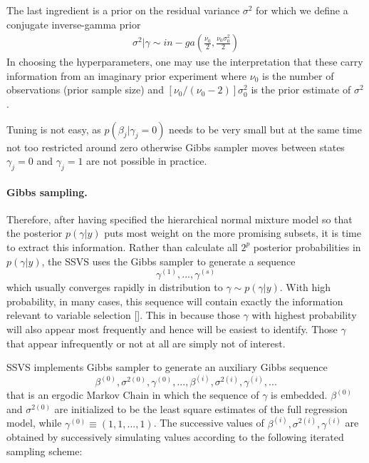 \documentclass[11 pt]{article}
\begin{document}
\begin{multicols}{2}
The last ingredient is a prior on the residual variance $\sigma^2$ for which we define a conjugate inverse-gamma prior
\begin{align*}
    \sigma^2|\gamma \sim in-ga \left(\frac{\nu_0}{2}, \frac{\nu_0\sigma^2_0}{2}\right)
\end{align*}
In choosing the hyperparameters, one may use the interpretation that these carry information from an imaginary prior experiment where $\nu_0$ is the number of observations (prior sample size) and $[\nu_0/(\nu_0-2)]\sigma^2_0$ is the prior estimate of $\sigma^2$.

Tuning is not easy, as $p(\beta_j | \gamma_j = 0)$ needs to be very small but at the same time not too restricted around zero otherwise Gibbs sampler moves between states $\gamma_j = 0$ and $\gamma_j = 1$ are not possible in practice. 

\paragraph{Gibbs sampling.} Therefore, after having specified the hierarchical normal mixture model so that the posterior $p(\gamma|y)$ puts most weight on the more promising subsets, it is time to extract this information. Rather than calculate all $2^p$ posterior probabilities in $p(\gamma|y)$, the SSVS uses the Gibbs sampler to generate a sequence $$\gamma^{(1)},...,\gamma^{(s)}$$ which usually converges rapidly in distribution to $\gamma \sim p(\gamma|y)$. With high probability, in many cases, this sequence will contain exactly the information relevant to variable selection [\cite{George1997}]. This in because those $\gamma$ with highest probability will also appear most frequently and hence will be easiest to identify. Those $\gamma$ that appear infrequently or not at all are simply not of interest. 

SSVS implements Gibbs sampler to generate an auxiliary Gibbs sequence $$\beta^{(0)}, \sigma^{2(0)}, \gamma^{(0)},..., \beta^{(i)}, \sigma^{2(i)}, \gamma^{(i)},...$$ that is an ergodic Markov Chain in which the sequence of $\gamma$ is embedded. $\beta^{(0)}$ and $\sigma^{2(0)}$ are initialized to be the least square estimates of the full regression model, while $\gamma^{(0)} \equiv (1,1,...,1)$. The successive values of $\beta^{(i)}, \sigma^{2(i)}, \gamma^{(i)}$ are obtained by successively simulating values according to the following iterated sampling scheme:


\end{multicols}
\end{document}
